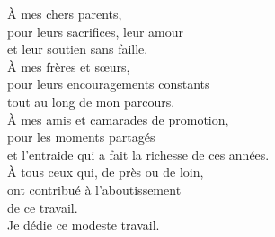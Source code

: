 \thispagestyle{empty}
\vspace*{4cm}
\begin{flushright}
  {\Large\itshape

  À mes chers parents,\\
  pour leurs sacrifices, leur amour\\
  et leur soutien sans faille.\\[1cm]

  À mes frères et s\oe urs,\\
  pour leurs encouragements constants\\
  tout au long de mon parcours.\\[1cm]

  À mes amis et camarades de promotion,\\
  pour les moments partagés\\
  et l'entraide qui a fait la richesse de ces années.\\[1cm]

  À tous ceux qui, de près ou de loin,\\
  ont contribué à l'aboutissement\\
  de ce travail.\\[1cm]

  Je dédie ce modeste travail.

  }
\end{flushright}
\newpage
